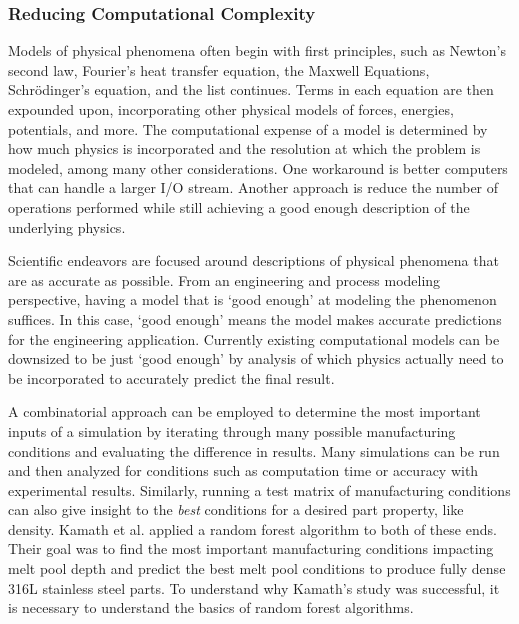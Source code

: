 \subsubsection{Reducing Computational Complexity}
Models of physical phenomena often begin with first principles, such as Newton's second law, Fourier's heat transfer equation, the Maxwell Equations, Schr\"odinger's equation, and the list continues. Terms in each equation are then expounded upon, incorporating other physical models of forces, energies, potentials, and more. The computational expense of a model is determined by how much physics is incorporated and the resolution at which the problem is modeled, among many other considerations. One workaround is better computers that can handle a larger I/O stream. Another approach is reduce the number of operations performed while still achieving a good enough description of the underlying physics.

Scientific endeavors are focused around descriptions of physical phenomena that are as accurate as possible. From an engineering and process modeling perspective, having a model that is `good enough' at modeling the phenomenon suffices. In this case, `good enough' means the model makes accurate predictions for the engineering application. Currently existing computational models can be downsized to be just `good enough' by analysis of which physics actually need to be incorporated to accurately predict the final result. 

A combinatorial approach can be employed to determine the most important inputs of a simulation by iterating through many possible manufacturing conditions and evaluating the difference in results. Many simulations can be run and then analyzed for conditions such as computation time or accuracy with experimental results. Similarly, running a test matrix of manufacturing conditions can also give insight to the \textit{best} conditions for a desired part property, like density. Kamath et al. applied a random forest algorithm to both of these ends. Their goal was to find the most important manufacturing conditions impacting melt pool depth and predict the best melt pool conditions to produce fully dense 316L stainless steel parts. To understand why Kamath's study was successful, it is necessary to understand the basics of random forest algorithms. 

